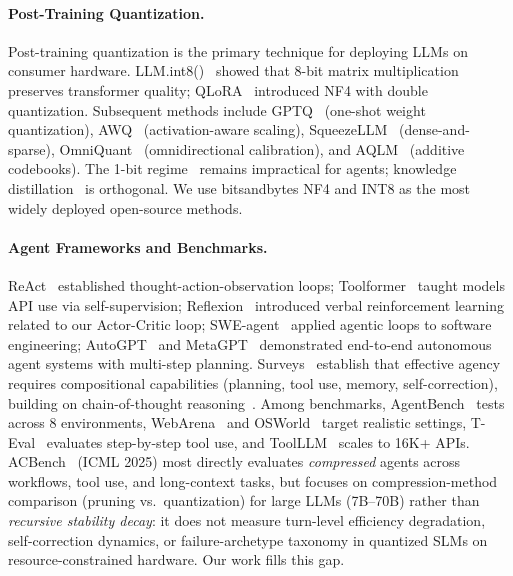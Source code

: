\documentclass{article}
\begin{document}
\paragraph{Post-Training Quantization.}
Post-training quantization is the primary technique for deploying LLMs on consumer hardware. LLM.int8()~\cite{dettmers2022llm} showed that 8-bit matrix multiplication preserves transformer quality; QLoRA~\cite{dettmers2023qlora} introduced NF4 with double quantization. Subsequent methods include GPTQ~\cite{frantar2023gptq} (one-shot weight quantization), AWQ~\cite{lin2024awq} (activation-aware scaling), SqueezeLLM~\cite{kim2024squeezellm} (dense-and-sparse), OmniQuant~\cite{shao2024omniquant} (omnidirectional calibration), and AQLM~\cite{egiazarian2024aqlm} (additive codebooks). The 1-bit regime~\cite{ma2024era} remains impractical for agents; knowledge distillation~\cite{xu2024chatglm} is orthogonal. We use bitsandbytes NF4 and INT8 as the most widely deployed open-source methods.

\paragraph{Agent Frameworks and Benchmarks.}
ReAct~\cite{yao2022react} established thought-action-observation loops; Toolformer~\cite{schick2023toolformer} taught models API use via self-supervision; Reflexion~\cite{shinn2023reflexion} introduced verbal reinforcement learning related to our Actor-Critic loop; SWE-agent~\cite{yang2024sweagent} applied agentic loops to software engineering; AutoGPT~\cite{autogpt2023} and MetaGPT~\cite{hong2024metagpt} demonstrated end-to-end autonomous agent systems with multi-step planning. Surveys~\cite{wang2024survey,xi2023rise} establish that effective agency requires compositional capabilities (planning, tool use, memory, self-correction), building on chain-of-thought reasoning~\cite{wei2022chainofthought}. Among benchmarks, AgentBench~\cite{liu2023agentbench} tests across 8 environments, WebArena~\cite{zhou2024webarena} and OSWorld~\cite{xie2024osworld} target realistic settings, T-Eval~\cite{chen2024teval} evaluates step-by-step tool use, and ToolLLM~\cite{qin2024toolllm} scales to 16K+ APIs. ACBench~\cite{dong2025acbench} (ICML 2025) most directly evaluates \emph{compressed} agents across workflows, tool use, and long-context tasks, but focuses on compression-method comparison (pruning vs.\ quantization) for large LLMs (7B--70B) rather than \emph{recursive stability decay}: it does not measure turn-level efficiency degradation, self-correction dynamics, or failure-archetype taxonomy in quantized SLMs on resource-constrained hardware. Our work fills this gap.
\end{document}
